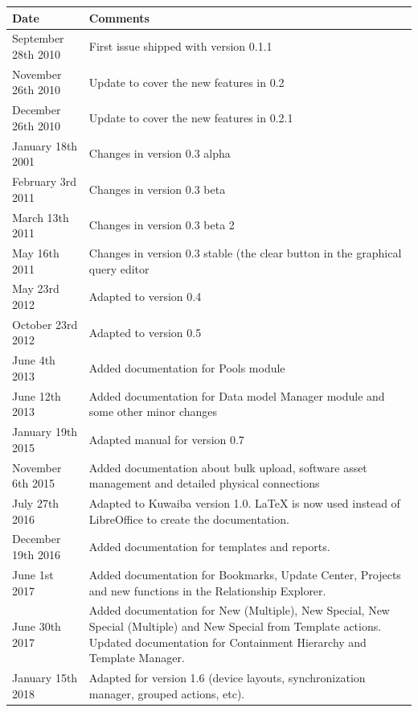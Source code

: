 \documentclass[a4paper]{article}
\begin{document}
		\begin{table}[h!]
			\centering
			\begin{tabular}{l||p{10cm}} %
				\toprule
				\textbf{Date} & \textbf{Comments}  \\
				\midrule
				September 28th 2010 & First issue shipped with version 0.1.1\\
				\midrule
				November 26th 2010 & Update to cover the new features in 0.2 \\
				\midrule
				December 26th 2010 & Update to cover the new features in 0.2.1 \\
				\midrule
				January 18th 2001 & Changes in version 0.3 alpha \\
				\midrule
				February 3rd 2011 & Changes in version 0.3 beta \\
				\midrule
				March 13th	2011 & Changes in version 0.3 beta 2 \\
				\midrule
				May 16th 2011 & Changes in version 0.3 stable (the clear button in the graphical query editor \\
				\midrule
				May 23rd 2012 & Adapted to version 0.4 \\
				\midrule
				October 23rd 2012 & Adapted to version 0.5 \\
				\midrule
				June 4th 2013 & Added documentation	for Pools module \\
				\midrule
				June 12th 2013 & Added documentation for Data model Manager module and some other minor changes\\
				\midrule
				January 19th 2015 & Adapted manual for version 0.7 \\
				\midrule
				November 6th 2015 & Added documentation about bulk upload, software asset management and detailed physical connections \\
				\midrule
				July 27th 2016 & Adapted to Kuwaiba version 1.0. LaTeX is now used instead of LibreOffice to create the documentation. \\
				\midrule
				December 19th 2016 & Added documentation for templates and reports.\\
				\midrule
				June 1st 2017 & Added documentation for Bookmarks, Update Center, Projects and new functions in the Relationship Explorer.\\
				\midrule
				June 30th 2017 & Added documentation for New (Multiple), New Special, New Special (Multiple) and New Special from Template actions. Updated documentation for Containment Hierarchy and Template Manager.\\
				\midrule
				January 15th 2018 & Adapted for version 1.6 (device layouts, synchronization manager, grouped actions, etc).\\
				\bottomrule
			\end{tabular}	
				
		\end{table}
		
\end{document}
